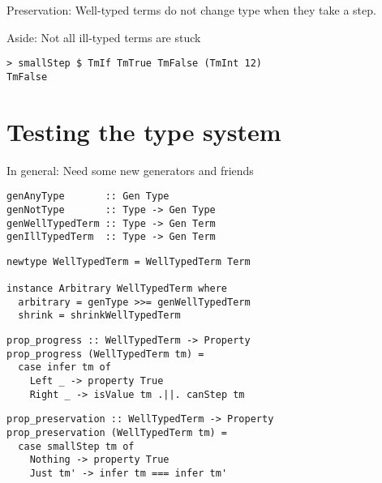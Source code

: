 \documentclass{beamer}
\begin{document}
\begin{frame}[c]
  \begin{center}
    Preservation: Well-typed terms do not change type when they take a step.
  \end{center}
\end{frame}

\begin{frame}[fragile,c]
  \begin{center}
    Aside: Not all ill-typed terms are stuck
  \end{center}
  \begin{verbatim}
> smallStep $ TmIf TmTrue TmFalse (TmInt 12)
TmFalse
  \end{verbatim}
\end{frame}

\section{Testing the type system}

\begin{frame}[fragile]
  \begin{center}
    In general: Need some new generators and friends
  \end{center}
  \begin{verbatim}
genAnyType       :: Gen Type
genNotType       :: Type -> Gen Type
genWellTypedTerm :: Type -> Gen Term
genIllTypedTerm  :: Type -> Gen Term
  \end{verbatim}
\end{frame}

\begin{frame}[fragile]
  \begin{verbatim}
newtype WellTypedTerm = WellTypedTerm Term

instance Arbitrary WellTypedTerm where
  arbitrary = genType >>= genWellTypedTerm
  shrink = shrinkWellTypedTerm
  \end{verbatim}
\end{frame}

\begin{frame}[fragile]
  \begin{verbatim}
prop_progress :: WellTypedTerm -> Property
prop_progress (WellTypedTerm tm) =
  case infer tm of
    Left _ -> property True
    Right _ -> isValue tm .||. canStep tm
  \end{verbatim}
\end{frame} 

\begin{frame}[fragile]
  \begin{verbatim}
prop_preservation :: WellTypedTerm -> Property
prop_preservation (WellTypedTerm tm) =
  case smallStep tm of
    Nothing -> property True
    Just tm' -> infer tm === infer tm'
  \end{verbatim}
\end{frame} 
\end{document}
